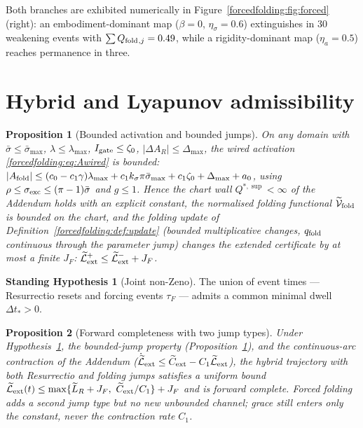 \documentclass[11pt,a4paper,oneside]{book}
\newcommand{\Igate}{I_{\rm gate}}
\newcommand{\Qf}{Q_{\rm fold}}
\newcommand{\qf}{q_{\rm fold}}
\newcommand{\Af}{A_{\rm fold}}
\theoremstyle{plain}
\newtheorem{proposition}{Proposition}[chapter]
\theoremstyle{definition}
\newtheorem{assumption}{Standing Hypothesis}[chapter]
\theoremstyle{remark}
\begin{document}
Both branches are exhibited numerically in Figure~\ref{forcedfolding:fig:forced} (right): an embodiment-dominant map
($\beta=0$, $\eta_\sigma=0.6$) extinguishes in $30$ weakening events with $\sum\Qf{}_{,j}=0.49$, while a
rigidity-dominant map ($\eta_a=0.5$) reaches permanence in three.

\section{Hybrid and Lyapunov admissibility}\label{forcedfolding:sec:lyap}

\begin{proposition}[Bounded activation and bounded jumps]\label{forcedfolding:prop:bounded}
On any domain with $\bar\sigma\le\bar\sigma_{\max}$, $\lambda\le\lambda_{\max}$, $\Igate\le\zeta_0$,
$|\Delta A_R|\le\Delta_{\max}$, the wired activation \eqref{forcedfolding:eq:Awired} is bounded:
$|\Af|\le(c_0-c_1\gamma)\lambda_{\max}+c_1k_\sigma\pi\bar\sigma_{\max}+c_1\zeta_0+\Delta_{\max}+a_0$,
using $\rho\le\sigma_{\rm exc}\le(\pi-1)\bar\sigma$ and $g\le1$. Hence the chart wall
$Q^{*,\sup}<\infty$ of the Addendum holds with an explicit constant, the normalised folding functional
$\widetilde{\mathcal V}_{\rm fold}$ is bounded on the chart, and the folding update of
Definition~\ref{forcedfolding:def:update} (bounded multiplicative changes, $\qf$ continuous through the parameter
jump) changes the extended certificate by at most a finite $J_F$:
$\widetilde{\mathcal L}_{\rm ext}^+\le\widetilde{\mathcal L}_{\rm ext}^-+J_F$.
\end{proposition}

\begin{assumption}[Joint non-Zeno]\label{forcedfolding:H:dwell}
The union of event times --- Resurrectio resets and forcing events $\tau_F$ --- admits a common minimal
dwell $\Delta t_\ast>0$.
\end{assumption}

\begin{proposition}[Forward completeness with two jump types]\label{forcedfolding:prop:hybrid}
Under Hypothesis~\ref{forcedfolding:H:dwell}, the bounded-jump property (Proposition~\ref{forcedfolding:prop:bounded}), and the
continuous-arc contraction of the Addendum
($\dot{\widetilde{\mathcal L}}_{\rm ext}\le\widetilde C_{\rm ext}-C_1\widetilde{\mathcal L}_{\rm ext}$),
the hybrid trajectory with both Resurrectio and folding jumps satisfies a uniform bound
$\widetilde{\mathcal L}_{\rm ext}(t)\le\max\{\widetilde L_R+J_F,\ \widetilde C_{\rm ext}/C_1\}+J_F$ and is
forward complete. Forced folding adds a second jump type but no new unbounded channel; grace still
enters only the constant, never the contraction rate $C_1$.
\end{proposition}
\end{document}
